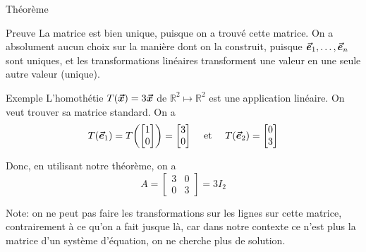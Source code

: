 \documentclass{article}
\begin{document}
\begin{parag}{Théorème}
\begin{subparag}{Preuve}
        La matrice est bien unique, puisque on a trouvé cette matrice. On a absolument aucun choix sur la manière dont on la construit, puisque $\bm{\protect\vec{e}}_1, \ldots, \bm{\protect\vec{e}}_n$ sont uniques, et les transformations linéaires transforment une valeur en une seule autre valeur (unique).
    \end{subparag}
\end{parag}

\begin{parag}{Exemple}
    L'homothétie $T\left(\bvec{x}\right) = 3\bvec{x}$ de $\mathbb{R}^2 \mapsto \mathbb{R}^2$ est une application linéaire. On veut trouver sa matrice standard. On a
    \[T\left(\bvec{e}_1\right) = T\left(\begin{bmatrix} 1 \\ 0 \end{bmatrix} \right) = \begin{bmatrix} 3 \\ 0 \end{bmatrix} \mathspace \text{ et } \mathspace T\left(\bvec{e}_2\right) = \begin{bmatrix} 0 \\ 3 \end{bmatrix} \]

    Donc, en utilisant notre théorème, on a
    \[A = \begin{bmatrix} 3 & 0 \\ 0 & 3 \end{bmatrix} = 3 I_2\]

    Note: on ne peut pas faire les transformations sur les lignes sur cette matrice, contrairement à ce qu'on a fait jusque là, car dans notre contexte ce n'est plus la matrice d'un système d'équation, on ne cherche plus de solution.
\end{parag}
\end{document}

